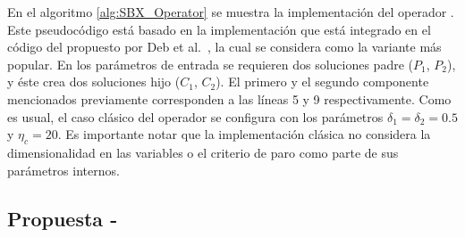 En el algoritmo \ref{alg:SBX_Operator} se muestra la implementación del operador \SBX{}.
%
Este pseudocódigo está basado en la implementación que está integrado en el código del \NSGAII{} propuesto por Deb et al.~\cite{Joel:NSGAII}, la cual se considera como la variante más popular.
%
En los parámetros de entrada se requieren dos soluciones padre ($P_1$, $P_2$), y éste crea dos soluciones hijo ($C_1$, $C_2$).
%
El primero y el segundo componente mencionados previamente corresponden a las líneas 5 y 9 respectivamente.
%
Como es usual, el caso clásico del operador \SBX{} se configura con los parámetros $\delta_1 = \delta_2 = 0.5$ y $\eta_c = 20$.
%
Es importante notar que la implementación clásica no considera la dimensionalidad en las variables o el criterio de paro como parte de sus parámetros internos.

\subsection{Propuesta - \DSBX{}}

